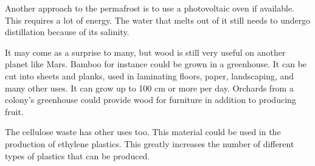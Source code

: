 Another approach to the permafrost is to use a photovoltaic oven if available. This requires a lot of energy. The water that melts out of it still needs to undergo distillation because of its salinity.

It may come as a surprise to many, but wood is still very useful on another planet like Mars. Bamboo for instance could be grown in a greenhouse. It can be cut into sheets and planks, used in laminating floors, paper, landscaping, and many other uses. It can grow up to 100 cm or more per day. Orchards from a colony's greenhouse could provide wood for furniture in addition to producing fruit. 

The cellulose waste has other uses too. This material could be used in the production of ethylene plastics. This greatly increases the number of different types of plastics that can be produced.

